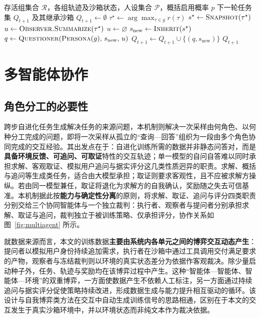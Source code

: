 \begin{algorithm}[htbp]
\caption{跨步自进化任务生成}
\label{alg:cross_step}
\begin{algorithmic}[1]
\Require 存活组集合 $\mathcal{R}$，各组轨迹及沙箱状态，人设集合 $\mathcal{P}$，概括启用概率 $p$
\Ensure 下一轮任务集 $Q_{t+1}$ 及其继承沙箱
\State $Q_{t+1} \gets \emptyset$
    \State $\tau^\star \gets \arg\max_{\tau \in g} r(\tau)$ 
    \State $s^\star \gets \textproc{Snapshot}(\tau^\star)$ 
     
        \State $u \gets \textproc{Observer.Summarize}(\tau^\star)$ 
    \Else
        \State $u \gets \varnothing$ 
    \EndIf
    \State $s_{\text{new}} \gets \textproc{Inherit}(s^\star)$ 
    \State $q \gets \textproc{Questioner}(\textproc{Persona}(g),\, s_{\text{new}},\, u)$ 
    \State $Q_{t+1} \gets Q_{t+1} \cup \{(q, s_{\text{new}})\}$
\EndFor
\State \Return $Q_{t+1}$
\end{algorithmic}
\end{algorithm}

\section{多智能体协作}

\subsection{角色分工的必要性}

跨步自进化任务生成解决任务的来源问题，本机制则解决一次采样由何角色、以何种分工完成的问题，即将一次采样从孤立的“查询—回答”组织为一段由多个角色协同完成的交互经验。其出发点在于：自进化训练所需的数据并非静态问答对，而是\textbf{具备环境反馈、可追问、可取证}特性的交互轨迹；单一模型的自问自答难以同时承担求解、客观取证、模拟用户追问与据实评分这几类性质迥异的职责。求解、概括与追问等生成类任务，适合由大模型承担；取证则要求客观性，且不应被求解方操纵。若由同一模型兼任，取证将退化为求解方的自我确认，奖励随之失去可信基准。本机制据此按\textbf{能力与确定性分离}的原则，将求解、取证、追问与评分四类职责分别交给三个协同智能体与一个独立裁判：执行者、观察者与提问者分别承担求解、取证与追问，裁判独立于被训练策略、仅承担评分，协作关系如图~\ref{fig:multiagent} 所示。

就数据来源而言，本文的训练数据\textbf{主要由系统内各单元之间的博弈交互动态产生}：提问者以模拟用户身份持续追加需求，执行者在沙箱中通过工具调用交付满足要求的产物，观察者与冻结裁判则以环境的真实状态差分为依据作客观裁决。除少量启动种子外，任务、轨迹与奖励均在该博弈过程中产生。这种“智能体—智能体、智能体—环境”的双重博弈，一方面使数据产生不依赖人工标注，另一方面通过持续追问与据实评分促使策略持续改进，形成数据生成与能力提升相互驱动的循环。该设计与自我博弈类方法在交互中自动生成训练信号的思路相通，区别在于本文的交互发生于真实沙箱环境中，并以环境状态而非纯文本作为裁决依据。

